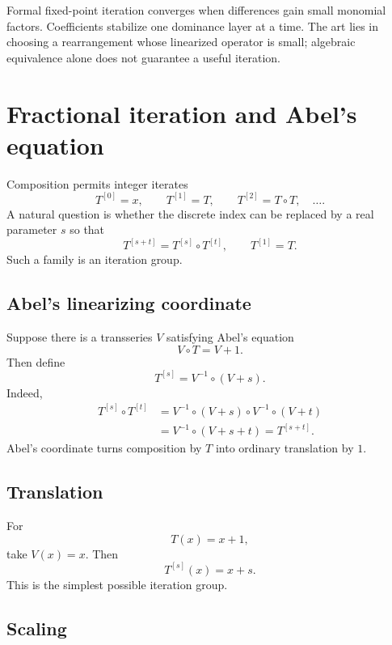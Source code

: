 \documentclass[11pt,openany]{book}
\theoremstyle{definition}
\theoremstyle{plain}
\theoremstyle{remark}
\begin{document}
\begin{summarybox}
Formal fixed-point iteration converges when differences gain small monomial factors. Coefficients stabilize one dominance layer at a time. The art lies in choosing a rearrangement whose linearized operator is small; algebraic equivalence alone does not guarantee a useful iteration.
\end{summarybox}


\chapter{Fractional iteration and Abel's equation}\label{ch:fractional-iteration}

Composition permits integer iterates
\[
 T^{[0]}=x,
 \qquad
 T^{[1]}=T,
 \qquad
 T^{[2]}=T\circ T,
 \quad\ldots.
\]
A natural question is whether the discrete index can be replaced by a real parameter $s$ so that
\begin{equation}\label{eq:iteration-group}
 T^{[s+t]}=T^{[s]}\circ T^{[t]},
 \qquad
 T^{[1]}=T.
\end{equation}
Such a family is an iteration group.

\section{Abel's linearizing coordinate}

Suppose there is a transseries $V$ satisfying Abel's equation
\begin{equation}\label{eq:Abel}
 V\circ T=V+1.
\end{equation}
Then define
\begin{equation}\label{eq:fractional-via-Abel}
 T^{[s]}=V^{-1}\circ(V+s).
\end{equation}
Indeed,
\begin{align*}
 T^{[s]}\circ T^{[t]}
 &=V^{-1}\circ(V+s)\circ V^{-1}\circ(V+t)\\
 &=V^{-1}\circ(V+s+t)=T^{[s+t]}.
\end{align*}
Abel's coordinate turns composition by $T$ into ordinary translation by $1$.

\section{Translation}

For
\[
 T(x)=x+1,
\]
take $V(x)=x$. Then
\[
 T^{[s]}(x)=x+s.
\]
This is the simplest possible iteration group.

\section{Scaling}
\end{document}
